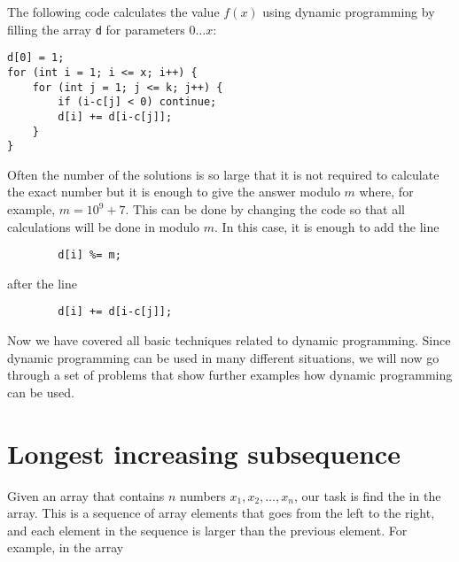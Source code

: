 The following code calculates the value $f(x)$
using dynamic programming by filling the array
\texttt{d} for parameters $0 \ldots x$:

\begin{lstlisting}
d[0] = 1;
for (int i = 1; i <= x; i++) {
    for (int j = 1; j <= k; j++) {
        if (i-c[j] < 0) continue;
        d[i] += d[i-c[j]];
    }
}
\end{lstlisting}

Often the number of the solutions is so large
that it is not required to calculate the exact number
but it is enough to give the answer modulo $m$
where, for example, $m=10^9+7$.
This can be done by changing the code so that
all calculations will be done in modulo $m$.
In this case, it is enough to add the line
\begin{lstlisting}
        d[i] %= m;
\end{lstlisting}
after the line
\begin{lstlisting}
        d[i] += d[i-c[j]];
\end{lstlisting}

Now we have covered all basic
techniques related to
dynamic programming.
Since dynamic programming can be used
in many different situations,
we will now go through a set of problems
that show further examples how dynamic
programming can be used.

\section{Longest increasing subsequence}


Given an array that contains $n$
numbers $x_1,x_2,\ldots,x_n$,
our task is find the
in the array.
This is a sequence of array elements
that goes from the left to the right,
and each element in the sequence is larger
than the previous element.
For example, in the array

